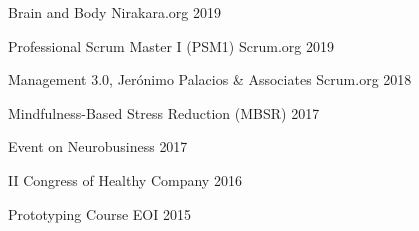 

\begin{cvhonors}

  \cvhonor
    {Brain and Body} %
    {Nirakara.org} %
    {} %
    {2019} %

  \cvhonor
    {Professional Scrum Master I (PSM1)} %
    {Scrum.org} %
    {} %
    {2019} %

  \cvhonor
    {Management 3.0, Jerónimo Palacios \& Associates} %
    {Scrum.org} %
    {} %
    {2018} %

  \cvhonor
    {Mindfulness-Based Stress Reduction (MBSR)} %
    {} %
    {} %
    {2017} %

  \cvhonor
    {Event on Neurobusiness} %
    {} %
    {} %
    {2017} %

  \cvhonor
    {II Congress of Healthy Company} %
    {} %
    {} %
    {2016} %

  \cvhonor
    {Prototyping Course} %
    {EOI} %
    {} %
    {2015} %

\end{cvhonors}
